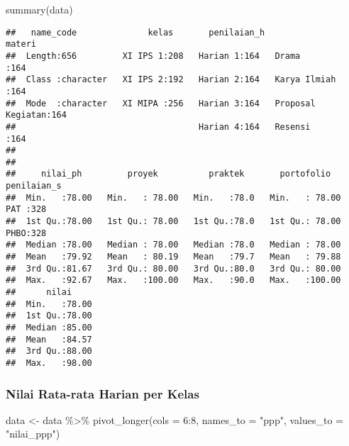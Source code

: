 \documentclass[
]{article}
\newenvironment{Shaded}{\begin{snugshade}}{\end{snugshade}}
\newcommand{\AttributeTok}[1]{\textcolor[rgb]{0.77,0.63,0.00}{#1}}
\newcommand{\DecValTok}[1]{\textcolor[rgb]{0.00,0.00,0.81}{#1}}
\newcommand{\FunctionTok}[1]{\textcolor[rgb]{0.00,0.00,0.00}{#1}}
\newcommand{\NormalTok}[1]{#1}
\newcommand{\OtherTok}[1]{\textcolor[rgb]{0.56,0.35,0.01}{#1}}
\newcommand{\SpecialCharTok}[1]{\textcolor[rgb]{0.00,0.00,0.00}{#1}}
\newcommand{\StringTok}[1]{\textcolor[rgb]{0.31,0.60,0.02}{#1}}
\begin{document}
\begin{Shaded}
\begin{Highlighting}[]
\FunctionTok{summary}\NormalTok{(data)}
\end{Highlighting}
\end{Shaded}

\begin{verbatim}
##   name_code              kelas       penilaian_h                materi   
##  Length:656         XI IPS 1:208   Harian 1:164   Drama            :164  
##  Class :character   XI IPS 2:192   Harian 2:164   Karya Ilmiah     :164  
##  Mode  :character   XI MIPA :256   Harian 3:164   Proposal Kegiatan:164  
##                                    Harian 4:164   Resensi          :164  
##                                                                          
##                                                                          
##     nilai_ph         proyek          praktek       portofolio     penilaian_s
##  Min.   :78.00   Min.   : 78.00   Min.   :78.0   Min.   : 78.00   PAT :328   
##  1st Qu.:78.00   1st Qu.: 78.00   1st Qu.:78.0   1st Qu.: 78.00   PHBO:328   
##  Median :78.00   Median : 78.00   Median :78.0   Median : 78.00              
##  Mean   :79.92   Mean   : 80.19   Mean   :79.7   Mean   : 79.88              
##  3rd Qu.:81.67   3rd Qu.: 80.00   3rd Qu.:80.0   3rd Qu.: 80.00              
##  Max.   :92.67   Max.   :100.00   Max.   :90.0   Max.   :100.00              
##      nilai      
##  Min.   :78.00  
##  1st Qu.:78.00  
##  Median :85.00  
##  Mean   :84.57  
##  3rd Qu.:88.00  
##  Max.   :98.00
\end{verbatim}

\hypertarget{nilai-rata-rata-harian-per-kelas}{%
\subsubsection{Nilai Rata-rata Harian per
Kelas}\label{nilai-rata-rata-harian-per-kelas}}

\begin{Shaded}
\begin{Highlighting}[]
\NormalTok{data }\OtherTok{\textless{}{-}}\NormalTok{ data }\SpecialCharTok{\%\textgreater{}\%} 
  \FunctionTok{pivot\_longer}\NormalTok{(}\AttributeTok{cols =} \DecValTok{6}\SpecialCharTok{:}\DecValTok{8}\NormalTok{,}
               \AttributeTok{names\_to =} \StringTok{"ppp"}\NormalTok{,}
               \AttributeTok{values\_to =} \StringTok{"nilai\_ppp"}\NormalTok{) }
\end{Highlighting}
\end{Shaded}
\end{document}
